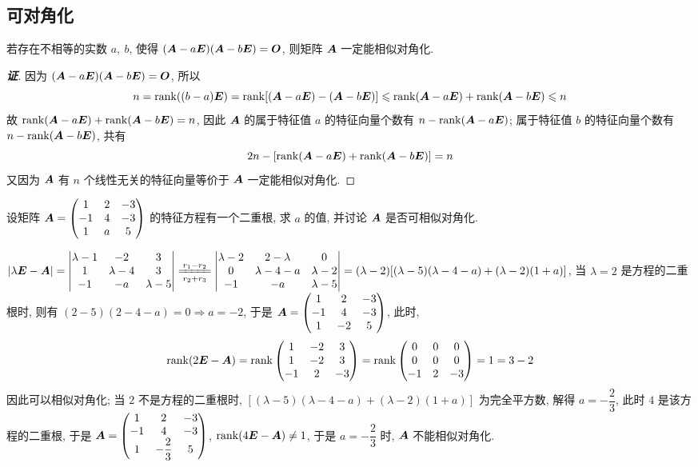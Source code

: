 \subsection{可对角化}

\begin{theorem}
    若存在不相等的实数 $a,~b$, 使得 $(\vb*{A}-a\vb*{E})(\vb*{A}-b\vb*{E})=\vb*{O}$, 则矩阵 $\vb*{A}$ 一定能相似对角化.
\end{theorem}
\begin{proof}[{\songti \textbf{证}}]
    因为 $(\vb*{A}-a\vb*{E})(\vb*{A}-b\vb*{E})=\vb*{O}$, 所以 $$n=\rank((b-a)\vb*{E})=\rank[(\vb*{A}-a\vb*{E})-(\vb*{A}-b\vb*{E})]\leqslant \rank(\vb*{A}-a\vb*{E})+\rank(\vb*{A}-b\vb*{E})\leqslant n$$
    故 $\rank(\vb*{A}-a\vb*{E})+\rank(\vb*{A}-b\vb*{E})=n$, 因此 $\vb*{A}$ 的属于特征值 $a$ 的特征向量个数有 $n-\rank(\vb*{A}-a\vb*{E})$; 属于特征值 $b$ 的特征向量个数有 $n-\rank(\vb*{A}-b\vb*{E})$, 共有
    $$2n-\qty[\rank(\vb*{A}-a\vb*{E})+\rank(\vb*{A}-b\vb*{E})]=n$$
    又因为 $\vb*{A}$ 有 $n$ 个线性无关的特征向量等价于 $\vb*{A}$ 一定能相似对角化.
\end{proof}


\begin{example}[2004 数一]
    设矩阵 $\vb*{A}=\mqty(1&2&-3\\-1&4&-3\\1&a&5)$ 的特征方程有一个二重根, 求 $a$ 的值, 并讨论 $\vb*{A}$ 是否可相似对角化.
\end{example}
\begin{solution}
    $|\lambda\vb*{E}-\vb*{A}|=\mqty|\lambda-1&-2&3\\1&\lambda-4&3\\-1&-a&\lambda-5|\xlongequal[r_2+r_3]{r_1-r_2}\mqty|\lambda-2&2-\lambda&0\\0&\lambda-4-a&\lambda-2\\-1&-a&\lambda-5|=(\lambda-2)\qty[(\lambda-5)(\lambda-4-a)+(\lambda-2)(1+a)]$, 
    当 $\lambda=2$ 是方程的二重根时, 则有 $(2-5)(2-4-a)=0\Rightarrow a=-2$, 于是 $\vb*{A}=\mqty(1&2&-3\\-1&4&-3\\1&-2&5)$, 此时, 
    $$\rank(2\vb*{E}-\vb*{A})=\rank\mqty(1&-2&3\\1&-2&3\\-1&2&-3)=\rank\mqty(0&0&0\\0&0&0\\-1&2&-3)=1=3-2$$
    因此可以相似对角化; 当 $2$ 不是方程的二重根时, $[(\lambda-5)(\lambda-4-a)+(\lambda-2)(1+a)]$ 为完全平方数, 解得 $a=-\dfrac{2}{3}$, 此时 $4$ 是该方程的二重根, 
    于是 $\vb*{A}=\mqty(1&2&-3\\-1&4&-3\\1&-\dfrac{2}{3}&5)$, $\rank(4\vb*{E}-\vb*{A})\neq 1$, 于是 $a=-\dfrac{2}{3}$ 时, $\vb*{A}$ 不能相似对角化.
\end{solution}

